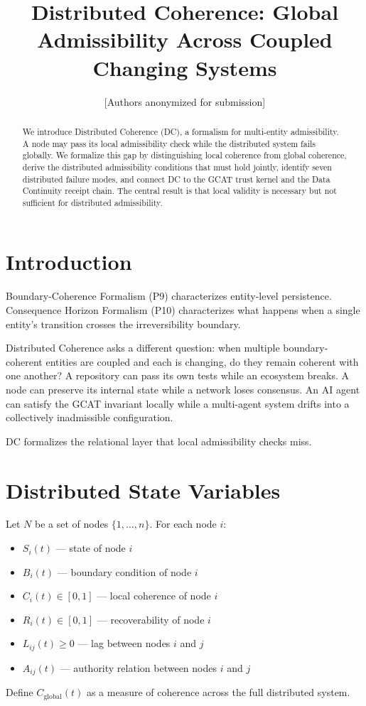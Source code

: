 \documentclass[letterpaper,10pt,conference]{ieeeconf}
\title{\bf Distributed Coherence: Global Admissibility Across Coupled Changing Systems}
\author{[Authors anonymized for submission]}
\newcommand{\Lij}{L_{ij}}
\begin{document}
\maketitle
\thispagestyle{empty}
\pagestyle{empty}

\begin{abstract}
We introduce Distributed Coherence (DC), a formalism for multi-entity admissibility. A node may pass its local admissibility check while the distributed system fails globally. We formalize this gap by distinguishing local coherence from global coherence, derive the distributed admissibility conditions that must hold jointly, identify seven distributed failure modes, and connect DC to the GCAT trust kernel and the Data Continuity receipt chain. The central result is that local validity is necessary but not sufficient for distributed admissibility.
\end{abstract}

\section{Introduction}
Boundary-Coherence Formalism (P9) characterizes entity-level persistence. Consequence Horizon Formalism (P10) characterizes what happens when a single entity's transition crosses the irreversibility boundary.

Distributed Coherence asks a different question: when multiple boundary-coherent entities are coupled and each is changing, do they remain coherent with one another? A repository can pass its own tests while an ecosystem breaks. A node can preserve its internal state while a network loses consensus. An AI agent can satisfy the GCAT invariant locally while a multi-agent system drifts into a collectively inadmissible configuration.

DC formalizes the relational layer that local admissibility checks miss.

\section{Distributed State Variables}

Let $N$ be a set of nodes $\{1, \ldots, n\}$. For each node $i$:
\begin{itemize}
\item $S_i(t)$ --- state of node $i$
\item $B_i(t)$ --- boundary condition of node $i$
\item $C_i(t) \in [0,1]$ --- local coherence of node $i$
\item $R_i(t) \in [0,1]$ --- recoverability of node $i$
\item $\Lij(t) \ge 0$ --- lag between nodes $i$ and $j$
\item $A_{ij}(t)$ --- authority relation between nodes $i$ and $j$
\end{itemize}
Define $C_{\text{global}}(t)$ as a measure of coherence across the full distributed system.
\end{document}
